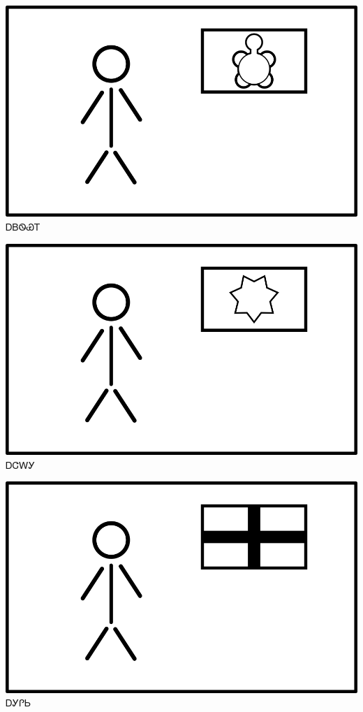 \documentclass[avery5371]{flashcards}%
\begin{document}

\begin{flashcard}{
\includegraphics[width=0.95\columnwidth,height=.51\columnwidth,keepaspectratio]{../artwork/flags/adaksi-flag}
}\Huge ᎠᏴᏫᏯᎢ
\end{flashcard}

\begin{flashcard}{
\includegraphics[width=0.95\columnwidth,height=.51\columnwidth,keepaspectratio]{../artwork/flags/ajalagi-flag}
}\Huge ᎠᏣᎳᎩ
\end{flashcard}

\begin{flashcard}{
\includegraphics[width=0.95\columnwidth,height=.51\columnwidth,keepaspectratio]{../artwork/flags/agilisi-flag}
}\Huge ᎠᎩᎵᏏ
\end{flashcard}
\end{document}
